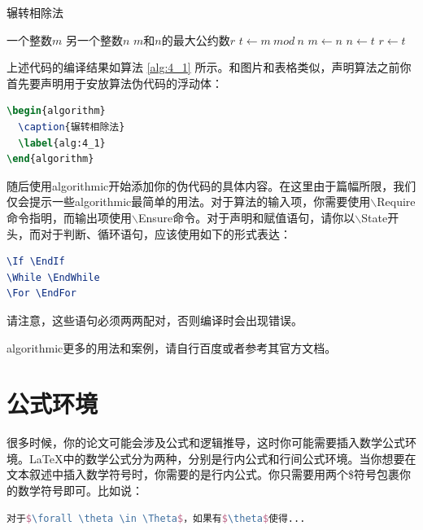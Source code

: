 \begin{algorithm}
\caption{辗转相除法}
\label{alg:4_1}
\begin{algorithmic}
\Require 一个整数$m$
\Require 另一个整数$n$
\Ensure $m$和$n$的最大公约数$r$
    \State $t \leftarrow m ~ mod ~ n$
    \State $m \leftarrow n$
    \State $n \leftarrow t$
\EndWhile
\State $r \leftarrow t$
\end{algorithmic}
\end{algorithm}


\noindent 上述代码的编译结果如算法 \ref{alg:4_1} 所示。和图片和表格类似，声明算法之前你首先要声明用于安放算法伪代码的浮动体：

\begin{tcolorbox}
\begin{lstlisting}[language=TeX]
\begin{algorithm}
  \caption{辗转相除法}
  \label{alg:4_1}
\end{algorithm}
\end{lstlisting}
\end{tcolorbox}

\noindent 随后使用{\codefont algorithmic}开始添加你的伪代码的具体内容。在这里由于篇幅所限，我们仅会提示一些{\codefont algorithmic}最简单的用法。对于算法的输入项，你需要使用{\codefont $\backslash$Require}命令指明，而输出项使用{\codefont $\backslash$Ensure}命令。对于声明和赋值语句，请你以{\codefont $\backslash$State}开头，而对于判断、循环语句，应该使用如下的形式表达：

\begin{tcolorbox}
\begin{lstlisting}[language=TeX]
\If \EndIf
\While \EndWhile
\For \EndFor
\end{lstlisting}
\end{tcolorbox}

\noindent 请注意，这些语句必须两两配对，否则编译时会出现错误。

{\codefont algorithmic}更多的用法和案例，请自行百度或者参考其官方文档。

\section{公式环境}

很多时候，你的论文可能会涉及公式和逻辑推导，这时你可能需要插入数学公式环境。\LaTeX 中的数学公式分为两种，分别是行内公式和行间公式环境。当你想要在文本叙述中插入数学符号时，你需要的是行内公式。你只需要用两个\$符号包裹你的数学符号即可。比如说：

\begin{tcolorbox}
\begin{lstlisting}[language=TeX]
对于$\forall \theta \in \Theta$，如果有$\theta$使得...
\end{lstlisting}
\end{tcolorbox}

